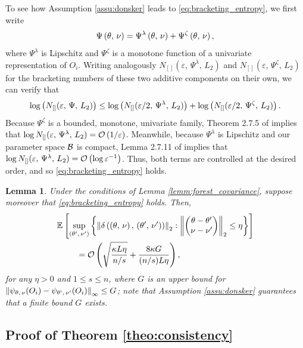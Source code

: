 \documentclass[aos]{imsart}
\theoremstyle{plain}
\newtheorem{lemm}[prop]{Lemma}
\theoremstyle{definition}
\theoremstyle{remark}
\begin{document}
\begin{CJK}{UTF8}{gbsn}
{\begin{appendix}
To see how Assumption \ref{assu:donsker} leads to \eqref{eq:bracketing_entropy}, we first write
$$ \Psi\left(\theta, \, \nu\right) = \Psi^{\lambda}\left(\theta, \, \nu\right) + \Psi^{\zeta}\left(\theta, \, \nu\right), $$
where $\Psi^\lambda$ is Lipschitz and $\Psi^\zeta$ is a monotone function of
a univariate representation of $O_i$. Writing analogously $N_{[]}(\varepsilon, \, \Psi^\lambda, \, L_2)$
and $N_{[]}(\varepsilon, \, \Psi^\zeta, \, L_2)$ for the bracketing numbers of these two additive
components on their own, we can verify that
$$ \log\left(N_{[]}(\varepsilon, \, \Psi, \, L_2)\right) \leq
\log\left(N_{[]}(\varepsilon/2, \, \Psi^\lambda, \, L_2)\right) +\log\left(N_{[]}(\varepsilon/2, \, \Psi^\zeta, \, L_2)\right). $$
Because $\Psi^\zeta$ is a bounded,
monotone, univariate family, Theorem 2.7.5 of \citet{van1996weak} implies that
$\log N_{[]}(\varepsilon, \, \Psi^\lambda, \, L_2) = \mathcal{O}\left(1/\varepsilon\right)$.
Meanwhile, because $\Psi^\lambda$ is Lipschitz and our parameter space $\mathcal{B}$ is compact,
Lemma 2.7.11 of \citet{van1996weak} implies that
$\log N_{[]}(\varepsilon, \, \Psi^\lambda, \, L_2) = \mathcal{O}\left(\log \varepsilon^{-1}\right)$. Thus, both
terms are controlled at the desired order, and so \eqref{eq:bracketing_entropy} holds.


\begin{lemm}
\label{lemm:delta_conc}
Under the conditions of Lemma \ref{lemm:forest_covariance},
suppose moreover that \eqref{eq:bracketing_entropy} holds. Then,
\begin{equation}
\label{eq:discr_concentration}
\begin{split}
&\EE{\sup_{\p{\theta', \, \nu'}}\cb{\Norm{\delta\p{\p{\theta, \, \nu}, \, \p{\theta', \, \nu'}}}_2  : \Norm{\begin{pmatrix} \theta - \theta' \\ \nu - \nu' \end{pmatrix}}_2 \leq \eta}} \\
&\ \ \ \ \ \ \ = \oo\p{\sqrt{\frac{\kappa L \eta}{ n/s }} + \frac{8\kappa G}{ (n/s)  {L\eta}}},
\end{split}
\end{equation}
 for any $\eta > 0$ and $1 \leq s \leq n$, where
 $G$ is an upper bound for $\left\lVert\psi_{\theta, \, \nu}(O_i) - \psi_{\theta', \, \nu'}(O_i)\right\rVert_\infty \leq G$;
 note that Assumption \ref{assu:donsker} guarantees that a finite bound $G$ exists.
\end{lemm}


\subsection*{Proof of Theorem \ref{theo:consistency}}


\end{appendix}}
\end{CJK}
\end{document}
